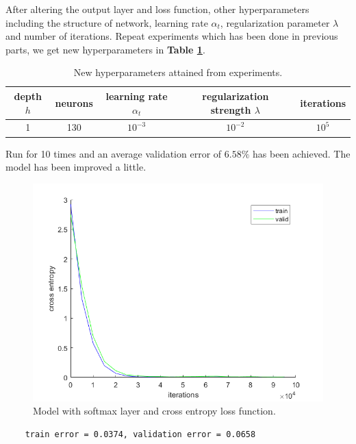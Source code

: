 \documentclass{article}
\begin{document}
After altering the output layer and loss function, other hyperparameters including the structure of network, learning rate $\alpha_t$, regularization parameter $\lambda$ and number of iterations. Repeat experiments which has been done in previous parts, we get new hyperparameters in \textbf{Table \ref{tab2}}.

\begin{table}[H]
	\centering
	\caption{New hyperparameters attained from experiments.}
	\label{tab2}
	\begin{tabular}{ccccc}
	\toprule
	depth $h$& neurons& learning rate $\alpha_t$& regularization strength $\lambda$ &iterations\\
	\midrule
	1& 130& $10^{-3}$& $10^{-2}$& $10^5$\\
	\bottomrule
	\end{tabular}
\end{table}

Run for 10 times and an average validation error of $6.58\%$ has been achieved. The model has been improved a little.

\begin{figure}[H]
	\centering
	\includegraphics[scale=0.5]{figure6}
	\caption{Model with softmax layer and cross entropy loss function.}
	\label{fig6}
\end{figure}

\begin{commandline}
	\begin{verbatim}
	train error = 0.0374, validation error = 0.0658
	\end{verbatim}
\end{commandline}
\end{document}
